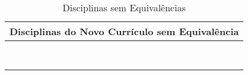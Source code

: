 \begin{table}
	\centering
	\renewcommand{\arraystretch}{1.5}
	\caption{Disciplinas sem Equivalências}
	\label{DiscSemEqui}
	\begin{tabularx}{\textwidth}{|X|}
		\hline
		{\textbf{Disciplinas do Novo Currículo sem Equivalência}} \\
		\hline
		\LogProg                                                  \\
		\IC                                                       \\
		\EngCompSoc                                               \\
		\MineraDados                                              \\
		\SistEmb                                                  \\
		\ProcImag                                                 \\
		\CompParal                                                \\
		\EstSup                                                   \\
		\hline
	\end{tabularx}
\end{table}
